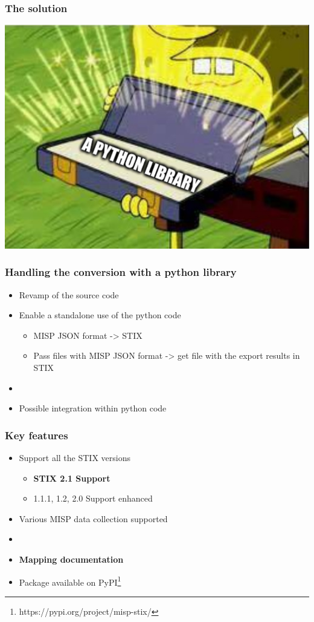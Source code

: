 \begin{frame}
    \frametitle{The solution}
    \begin{center}
        \includegraphics[scale=0.3]{images/solution.png}
    \end{center}
\end{frame}

\begin{frame}
    \frametitle{Handling the conversion with a python library}
    \begin{itemize}
        \item Revamp of the source code
        \item Enable a standalone use of the python code
        \begin{itemize}
            \item MISP JSON  format -> STIX
            \item Pass files with MISP JSON format -> get file with the export results in STIX
        \end{itemize}
        \item []
        \item Possible integration within python code
    \end{itemize}
\end{frame}

\begin{frame}
    \frametitle{Key features}
    \begin{itemize}
        \item Support all the STIX versions
        \begin{itemize}
            \item {\bf STIX 2.1 Support}
            \item 1.1.1, 1.2, 2.0 Support enhanced
        \end{itemize}
        \item Various MISP data collection supported
        \item[]
        \item {\bf Mapping documentation}
        \item Package available on PyPI\footnote{https://pypi.org/project/misp-stix/}
    \end{itemize}
\end{frame}

